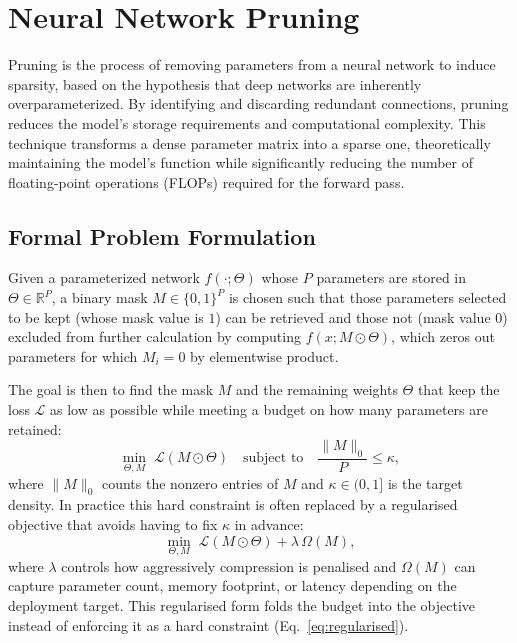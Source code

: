\section{Neural Network Pruning}

Pruning is the process of removing parameters from a neural network to induce sparsity, based on the hypothesis that deep networks are inherently overparameterized. By identifying and discarding redundant connections, pruning reduces the model's storage requirements and computational complexity. This technique transforms a dense parameter matrix into a sparse one, theoretically maintaining the model's function while significantly reducing the number of floating-point operations (FLOPs) required for the forward pass.

\subsection{Formal Problem Formulation}

Given a parameterized network $f(\cdot;\Theta)$ whose $P$ parameters are
stored in $\Theta \in \mathbb{R}^P$, a binary mask $M \in \{0,1\}^P$ is
chosen such that those parameters selected to be kept (whose mask value is
$1$) can be retrieved and those not (mask value $0$) excluded from further
calculation by computing $f(x; M \odot \Theta)$, which zeros out parameters
for which $M_i = 0$ by elementwise product.

The goal is then to find the mask $M$ and the remaining weights $\Theta$ that
keep the loss $\mathcal{L}$ as low as possible while meeting a budget on how
many parameters are retained:
\begin{equation}
	\min_{\Theta, M}\; \mathcal{L}(M \odot \Theta)
	\quad
	\text{subject to}
	\quad
	\frac{\lVert M \rVert_0}{P} \le \kappa,
	\label{eq:constrained}
\end{equation}
where $\lVert M \rVert_0$ counts the nonzero entries of $M$ and $\kappa \in
(0,1]$ is the target density. In practice this hard constraint is often
replaced by a regularised objective that avoids having to fix $\kappa$ in
advance:
\begin{equation}
	\min_{\Theta, M}\; \mathcal{L}(M \odot \Theta) + \lambda\,\Omega(M),
	\label{eq:regularised}
\end{equation}
where $\lambda$ controls how aggressively compression is penalised and
$\Omega(M)$ can capture parameter count, memory footprint, or latency
depending on the deployment target. This regularised form folds the budget into the objective instead of enforcing it as a hard constraint (Eq.~\eqref{eq:regularised}).

